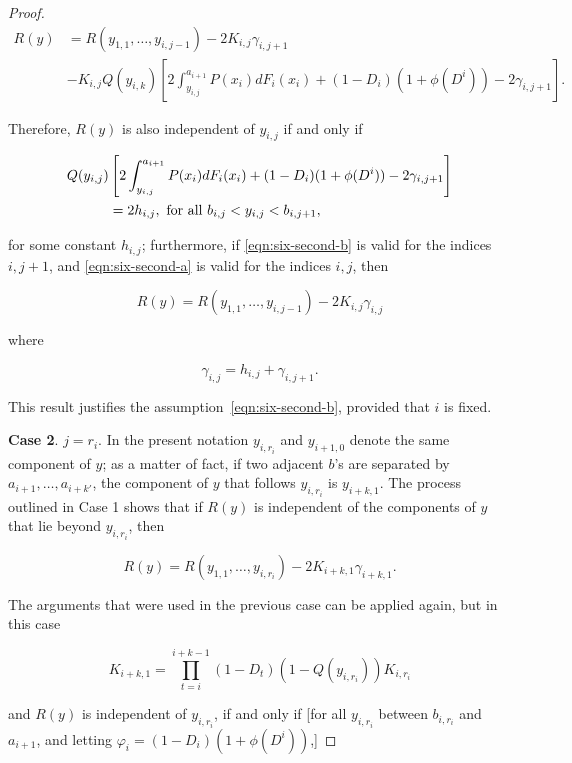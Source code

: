 \documentclass{article}
\theoremstyle{remark}
\begin{document}
\begin{proof}
\[
\begin{aligned}
R(y) &= R(y_{1, 1}, \dots, y_{i, j-1}) - 2K_{i, j} \gamma_{i, j+1} \\
&- K_{i, j} Q(y_{i, k}) \left [
2 \int_{y_{i, j}}^{a_{i+1}} P(x_i) dF_i(x_i) + (1-D_i)(1 + \phi(D^i)) - 2
\gamma_{i, j+1}
\right ].
\end{aligned}
\]

Therefore, $R(y)$ is also independent of $y_{i, j}$ if and only if

\begin{align}
Q(y_{i, j}) &
\left [
2 \int_{y_{i, j}}^{a_{i+1}} P(x_i) dF_i(x_i) + (1 - D_i) (1 + \phi(D^i)) -
2\gamma_{i, j+1}
\right ] \label{eqn:six-second-a} \\
&= 2h_{i, j}, \textup{ for all } b_{i, j} < y_{i, j} < b_{i, j+1}, \notag
\end{align}

for some constant $h_{i, j}$; furthermore, if \eqref{eqn:six-second-b} is valid
for the indices $i, j+1$, and \eqref{eqn:six-second-a} is valid for the indices
$i, j$, then

\[
R(y) = R(y_{1, 1}, \dots, y_{i, j-1}) - 2K_{i, j} \gamma_{i, j}
\]

where

\begin{equation}
\gamma_{i, j} = h_{i,j} + \gamma_{i, j+1}. \label{eqn:six-two}
\end{equation}

This result justifies the assumption~\eqref{eqn:six-second-b}, provided that
$i$ is fixed.

\textbf{Case 2}. $j = r_i$. In the present notation $y_{i, r_i}$ and $y_{i+1,
0}$ denote the same component of $y$; as a matter of fact, if two adjacent
$b$'s are separated by $a_{i+1}, \dots, a_{i + k'}$, the component of $y$ that
follows $y_{i, r_i}$ is $y_{i+k, 1}$. The process outlined in Case 1 shows that
if $R(y)$ is independent of the components of $y$ that lie beyond $y_{i,
r_i}$, then

\[
R(y) = R(y_{1, 1}, \dots, y_{i, r_i}) - 2K_{i+k, 1} \gamma_{i+k, 1}.
\]

The arguments that were used in the previous case can be applied again, but in
this case

\[
K_{i+k, 1} = \prod_{t=i}^{i+k-1} (1 - D_t) (1 - Q(y_{i, r_i})) K_{i, r_i}
\]

and $R(y)$ is independent of $y_{i, r_i}$, if and only if [for all $y_{i, r_i}$
between $b_{i, r_i}$ and $a_{i+1}$, and letting $\varphi_i = (1-D_i)(1 +
\phi(D^i))$,]


\end{proof}
\end{document}
